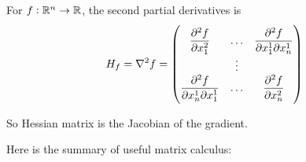 \begin{definition}
    For $f: \mathbb{R}^n \rightarrow \mathbb{R}$, the second partial derivatives is
    \begin{equation}
        H_f = \nabla^2 f = \begin{pmatrix}
            \dpd[2]{f}{x_1} & \hdots & \dmd{f}{2}{x_1}{1}{x_n}{1} \\
            & \vdots \\
            \dmd{f}{2}{x_n}{1}{x_1}{1} & \hdots & \dpd[2]{f}{x_n}
        \end{pmatrix}
    \end{equation}
    
    So Hessian matrix is the Jacobian of the gradient.
\end{definition}

Here is the summary of useful matrix calculus:

